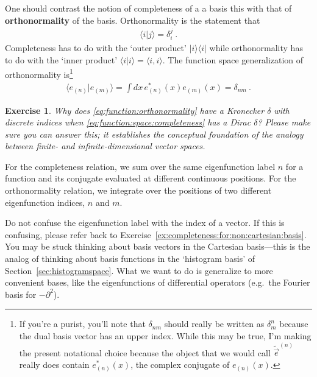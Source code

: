 \documentclass[
  11pt,
	colorful,
	raggedright,
]{tufte-style-thesis-flip}
\newtheorem{exercise}{Exercise}[section]
\begin{document}
One should contrast the notion of completeness of a a basis this with that of \textbf{orthonormality} of the basis. Orthonormality is the statement that
\begin{align}
  \langle i | j \rangle = \delta^j_i \ .
\end{align}
Completeness has to do with the `outer product' $|i\rangle \langle i|$ while orthonormality has to do with the `inner product' $\langle i | i\rangle = \langle i, i\rangle$. The function space generalization of orthonormality is\footnote{If you're a purist, you'll note that $\delta_{nm}$ should really be written as $\delta^n_m$ because the dual basis vector has an upper index. While this may be true, I'm making the present notational choice because the object that we would call $\tilde{\vec{e}}^{(n)}$ really does contain $e_{(n)}^*(x)$, the complex conjugate of $e_{(n)}(x)$.}
\begin{align}
  \langle e_{(n)} | e_{(m)} \rangle = \int dx \, e_{(n)}^*(x) e_{(m)}(x) = \delta_{nm} \ .
  \label{eq:function:orthonormality}
\end{align}
\begin{exercise}
Why does \eqref{eq:function:orthonormality} have a Kronecker $\delta$ with discrete indices when \eqref{eq:function:space:completeness} has a Dirac $\delta$? Please make sure you can answer this; it establishes the conceptual foundation of the analogy between finite- and infinite-dimensional vector spaces.
\end{exercise}
For the completeness relation, we sum over the same eigenfunction label $n$ for a function and its conjugate evaluated at different continuous positions. For the orthonormality relation, we integrate over the positions of two different eigenfunction indices, $n$ and $m$. 

Do not confuse the eigenfunction label with the index of a vector. If this is confusing, please refer back to Exercise~\ref{ex:completeness:for:non:cartesian:basis}. You may be stuck thinking about basis vectors in the Cartesian basis---this is the analog of thinking about basis functions in the `histogram basis' of Section~\ref{sec:histogramspace}. What we want to do is generalize to more convenient bases, like the eigenfunctions of differential operators (e.g.~the Fourier basis for $-\partial^2$).
\end{document}
